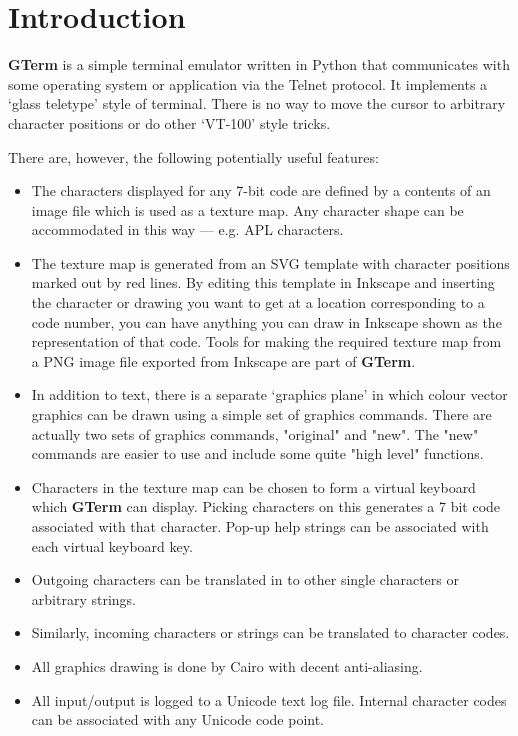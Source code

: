\documentclass[a4paper,twoside,11pt]{article}
\newcommand{\newpara}{\par\vspace{4mm}\noindent}
\newcommand{\textbfc}[1]{\textcolor{OurRed}{#1}}
\begin{document}
\section{Introduction}
\textbf{GTerm} is a simple terminal emulator written in Python that communicates with some operating system
or application via the Telnet protocol. It implements a `glass teletype' style of terminal. There is
no way to move the cursor to arbitrary character positions or do other `VT-100' style tricks.
\newpara
There are, however, the following potentially useful features:
\begin{itemize}
\item The characters displayed for any 7-bit code are defined by a contents of an image file
      which is used as a texture map. \textbfc{Any character shape can be accommodated in this way --- e.g. APL characters}.
\item The texture map is generated from an SVG template with character positions marked out by red lines.
      By editing this template in Inkscape and inserting the character or drawing you want to get at a
      location corresponding to a code number, you can have anything you can draw in Inkscape shown as
      the representation of that code. Tools for making the required texture map from a PNG image
      file exported from Inkscape are part of \textbf{GTerm}.
\item \textbfc{In addition to text, there is a separate `graphics plane' in which colour vector graphics can
      be drawn using a simple set of graphics commands}. There are actually two sets of graphics commands, "original" and
      "new". The "new" commands are easier to use and include some quite "high level" functions.
\item \textbfc{Characters in the texture map can be chosen to form a virtual keyboard which \textbf{GTerm} can display}.
      Picking characters on this generates a 7 bit code associated with that character. Pop-up help strings can be associated
      with each virtual keyboard key.
\item Outgoing characters can be translated in to other single characters or arbitrary strings.
\item Similarly, incoming characters or strings can be translated to character codes.
\item All graphics drawing is done by Cairo with decent anti-aliasing. 
\item All input/output is logged to a Unicode text log file. Internal character codes can be associated
      with any Unicode code point.

\end{itemize}
\end{document}
